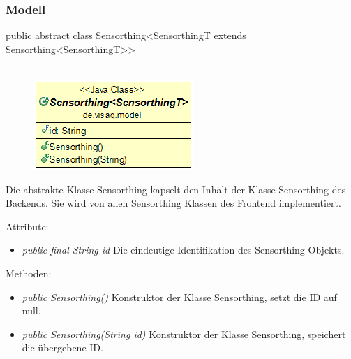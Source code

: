 \subsubsection{Modell}


public abstract class Sensorthing<SensorthingT extends Sensorthing<SensorthingT>>
\\\\
\begin{minipage}{0.3\textwidth}
	\begin{figure}[H]
		\includegraphics[scale = 0.5
		]{media/frontend/model/SensorthingClass.png}
	\end{figure}
\end{minipage} \hfill
\begin{minipage}{0.6\textwidth}
	Die abstrakte Klasse Sensorthing kapselt den Inhalt der Klasse Sensorthing des Backends. Sie wird von allen Sensorthing Klassen des Frontend implementiert.
\end{minipage}

Attribute:
\begin{itemize} 
	\item \emph{public final String id} Die eindeutige Identifikation des Sensorthing Objekts.
\end{itemize}
Methoden:
\begin{itemize} 
	\item \emph{public Sensorthing()} Konstruktor der Klasse Sensorthing, setzt die ID auf null.
	\item \emph{public Sensorthing(String id)} Konstruktor der Klasse Sensorthing, speichert die übergebene ID.
\end{itemize}

